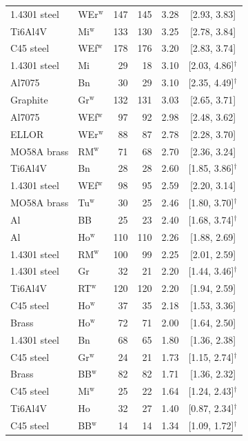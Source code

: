 \documentclass[final,3p,times,twocolumn]{elsarticle}
\theoremstyle{definition}
\begin{document}
\begin{table}[htbp]
\begin{tabular}{@{}llrrrc@{}}
    1.4301 steel & WEr$^{\text{w}}$ & 147 & 145 & 3.28 & [2.93, 3.83] \\
    Ti6Al4V & Mi$^{\text{w}}$ & 133 & 130 & 3.25 & [2.78, 3.84] \\
    C45 steel & WEf$^{\text{w}}$ & 178 & 176 & 3.20 & [2.83, 3.74] \\
    1.4301 steel & Mi & 29 & 18 & 3.10 & [2.03, 4.86]$^{\dagger}$ \\
    Al7075 & Bn & 30 & 29 & 3.10 & [2.35, 4.49]$^{\dagger}$ \\
    Graphite & Gr$^{\text{w}}$ & 132 & 131 & 3.03 & [2.65, 3.71] \\
    Al7075 & WEf$^{\text{w}}$ & 97 & 92 & 2.98 & [2.48, 3.62] \\
    ELLOR & WEr$^{\text{w}}$ & 88 & 87 & 2.78 & [2.28, 3.70] \\
    MO58A brass & RM$^{\text{w}}$ & 71 & 68 & 2.70 & [2.36, 3.24] \\
    Ti6Al4V & Bn & 28 & 28 & 2.60 & [1.85, 3.86]$^{\dagger}$ \\
    1.4301 steel & WEf$^{\text{w}}$ & 98 & 95 & 2.59 & [2.20, 3.14] \\
    MO58A brass & Tu$^{\text{w}}$ & 30 & 25 & 2.46 & [1.80, 3.70]$^{\dagger}$ \\
    Al & BB & 25 & 23 & 2.40 & [1.68, 3.74]$^{\dagger}$ \\
    Al & Ho$^{\text{w}}$ & 110 & 110 & 2.26 & [1.88, 2.69] \\
    1.4301 steel & RM$^{\text{w}}$ & 100 & 99 & 2.25 & [2.01, 2.59] \\
    1.4301 steel & Gr & 32 & 21 & 2.20 & [1.44, 3.46]$^{\dagger}$ \\
    Ti6Al4V & RT$^{\text{w}}$ & 120 & 120 & 2.20 & [1.94, 2.59] \\
    C45 steel & Ho$^{\text{w}}$ & 37 & 35 & 2.18 & [1.53, 3.36] \\
    Brass & Ho$^{\text{w}}$ & 72 & 71 & 2.00 & [1.64, 2.50] \\
    1.4301 steel & Bn & 68 & 65 & 1.80 & [1.36, 2.38] \\
    C45 steel & Gr$^{\text{w}}$ & 24 & 21 & 1.73 & [1.15, 2.74]$^{\dagger}$ \\
    Brass & BB$^{\text{w}}$ & 82 & 82 & 1.71 & [1.36, 2.32] \\
    C45 steel & Mi$^{\text{w}}$ & 25 & 22 & 1.64 & [1.24, 2.43]$^{\dagger}$ \\
    Ti6Al4V & Ho & 32 & 27 & 1.40 & [0.87, 2.34]$^{\dagger}$ \\
    C45 steel & BB$^{\text{w}}$ & 14 & 14 & 1.34 & [1.09, 1.72]$^{\dagger}$ \\

\end{tabular}
\end{table}
\end{document}
